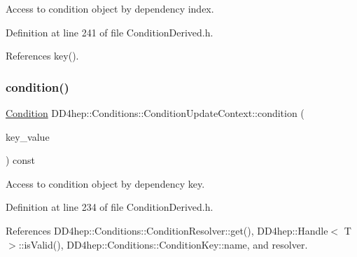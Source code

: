 Access to condition object by dependency index. 



Definition at line 241 of file Condition\+Derived.\+h.



References key().

\hypertarget{class_d_d4hep_1_1_conditions_1_1_condition_update_context_aa12850a6ffa370ee58f4516a07363249}{}\label{class_d_d4hep_1_1_conditions_1_1_condition_update_context_aa12850a6ffa370ee58f4516a07363249} 
\subsubsection{\texorpdfstring{condition()}{condition()}\hspace{0.1cm}{\footnotesize\ttfamily [2/2]}}
{\footnotesize\ttfamily \hyperlink{class_d_d4hep_1_1_conditions_1_1_condition}{Condition} D\+D4hep\+::\+Conditions\+::\+Condition\+Update\+Context\+::condition (\begin{DoxyParamCaption}\item[{const \hyperlink{class_d_d4hep_1_1_conditions_1_1_condition_key}{Condition\+Key} \&}]{key\+\_\+value }\end{DoxyParamCaption}) const\hspace{0.3cm}{\ttfamily [inline]}}



Access to condition object by dependency key. 



Definition at line 234 of file Condition\+Derived.\+h.



References D\+D4hep\+::\+Conditions\+::\+Condition\+Resolver\+::get(), D\+D4hep\+::\+Handle$<$ T $>$\+::is\+Valid(), D\+D4hep\+::\+Conditions\+::\+Condition\+Key\+::name, and resolver.

\hypertarget{class_d_d4hep_1_1_conditions_1_1_condition_update_context_a436fabf5620b157ae53005d8ac1b7bde}{}\label{class_d_d4hep_1_1_conditions_1_1_condition_update_context_a436fabf5620b157ae53005d8ac1b7bde} 
